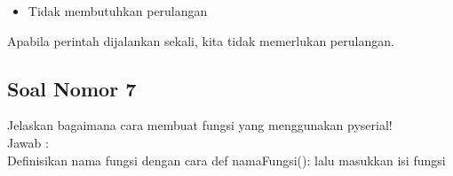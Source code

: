 \begin{itemize}
\item Tidak membutuhkan perulangan
\end{itemize}
Apabila perintah dijalankan sekali, kita tidak memerlukan perulangan.

\subsection{Soal Nomor 7}
Jelaskan bagaimana cara membuat fungsi yang menggunakan pyserial!\\
Jawab :\\
Definisikan nama fungsi dengan cara def namaFungsi(): lalu masukkan isi fungsi

